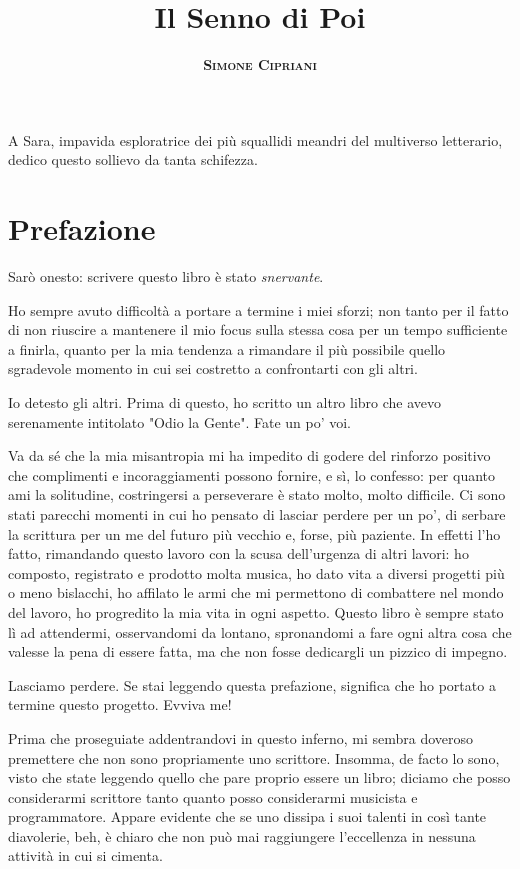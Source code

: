 \documentclass[12pt]{book}
\title{
	\Huge \textbf{Il Senno di Poi}
}
\author{
	\textsc{\textbf{Simone Cipriani}}
}
\newenvironment{dedication} {
	\cleardoublepage\thispagestyle{empty}
	\vspace*{\stretch{1}}
	\hfill\begin{minipage}[t]{0.66\textwidth}
	\raggedright}
{
	\end{minipage}
	\vspace*{\stretch{3}}
	\clearpage
}
\begin{document}
\setlength{\parskip}{0.25em}
\setlength{\parindent}{0.5em}

\frontmatter
\maketitle
\begin{dedication}
	A Sara, impavida esploratrice dei più squallidi meandri del multiverso letterario, dedico questo sollievo da tanta schifezza.
\end{dedication}

\mainmatter\chapter*{Prefazione}

Sarò onesto: scrivere questo libro è stato \emph{snervante}.

Ho sempre avuto difficoltà a portare a termine i miei sforzi; non tanto per il fatto di non riuscire a mantenere il mio focus sulla stessa cosa per un tempo sufficiente a finirla, quanto per la mia tendenza a rimandare il più possibile quello sgradevole momento in cui sei costretto a confrontarti con gli altri. 

Io detesto gli altri. Prima di questo, ho scritto un altro libro che avevo serenamente intitolato "Odio la Gente". Fate un po' voi.

Va da sé che la mia misantropia mi ha impedito di godere del rinforzo positivo che complimenti e incoraggiamenti possono fornire, e sì, lo confesso: per quanto ami la solitudine, costringersi a perseverare è stato molto, molto difficile. Ci sono stati parecchi momenti in cui ho pensato di lasciar perdere per un po', di serbare la scrittura per un me del futuro più vecchio e, forse, più paziente. In effetti l'ho fatto, rimandando questo lavoro con la scusa dell'urgenza di altri lavori: ho composto, registrato e prodotto molta musica, ho dato vita a diversi progetti più o meno bislacchi, ho affilato le armi che mi permettono di combattere nel mondo del lavoro, ho progredito la mia vita in ogni aspetto. Questo libro è sempre stato lì ad attendermi, osservandomi da lontano, spronandomi a fare ogni altra cosa che valesse la pena di essere fatta, ma che non fosse dedicargli un pizzico di impegno.

Lasciamo perdere. Se stai leggendo questa prefazione, significa che ho portato a termine questo progetto. Evviva me!

Prima che proseguiate addentrandovi in questo inferno, mi sembra doveroso premettere che non sono propriamente uno scrittore. Insomma, de facto lo sono, visto che state leggendo quello che pare proprio essere un libro; diciamo che posso considerarmi scrittore tanto quanto posso considerarmi musicista e programmatore. Appare evidente che se uno dissipa i suoi talenti in così tante diavolerie, beh, è chiaro che non può mai raggiungere l'eccellenza in nessuna attività in cui si cimenta.
\end{document}

